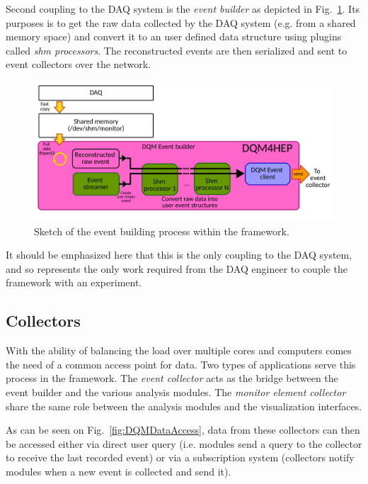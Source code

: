 \documentclass[conference]{IEEEtran}
\begin{document}
Second coupling to the DAQ system is the \textit{event builder} as depicted in Fig.~\ref{fig:DQMEventBuilder}. Its purposes is to get the raw data collected by the DAQ system (e.g. from a shared memory space) and convert it to an user defined data structure using plugins called \textit{shm processors}. The reconstructed events are then serialized and sent to event collectors over the network.

\begin{figure}[htbp]
  \begin{center}
    \includegraphics[width=0.95\linewidth]{figs/EventBuilderDiagram_IEEE.pdf}
    \caption{\label{fig:DQMEventBuilder} Sketch of the event building process within the framework.}
  \end{center}
\end{figure}

It should be emphasized here that this is the only coupling to the DAQ system, and so represents the only work required from the DAQ engineer to couple the framework with an experiment.


\subsection{Collectors}
With the ability of balancing the load over multiple cores and computers comes the need of a common access point for data. Two types of applications serve this process in the framework. The \textit{event collector} acts as the bridge between the event builder and the various analysis modules. The \textit{monitor element collector} share the same role between the analysis modules and the visualization interfaces.

As can be seen on Fig.~\ref{fig:DQMDataAccess}, data from these collectors can then be accessed either via direct user query (i.e. modules send a query to the collector to receive the last recorded event) or via a subscription system (collectors notify modules when a new event is collected and send it).
\end{document}
